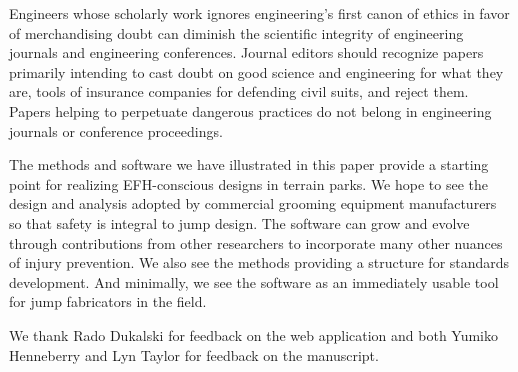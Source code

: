 \documentclass[smallextended]{svjour3}       %
\begin{document}
Engineers whose scholarly work ignores engineering's first canon of ethics in favor of merchandising doubt can diminish the scientific integrity of engineering journals and
engineering conferences. Journal editors should recognize papers primarily intending to cast doubt on good science and engineering for what they are, tools of insurance companies for defending civil suits, and reject them. Papers
helping to perpetuate dangerous practices do not belong in engineering journals
or conference proceedings.

The methods and software we have illustrated in this paper provide a starting point for realizing EFH-conscious designs in terrain parks. We hope to see the design and analysis adopted by commercial grooming equipment manufacturers so that safety is integral to jump design. The software can grow and evolve through contributions from other researchers to incorporate many other nuances of injury prevention. We also see the methods providing a structure for standards development. And minimally, we see the software as an immediately usable tool for jump fabricators in the field.



\begin{acknowledgements}
  We thank Rado Dukalski for feedback on the web application and both Yumiko
  Henneberry and Lyn Taylor for feedback on the manuscript.
\end{acknowledgements}
\end{document}
